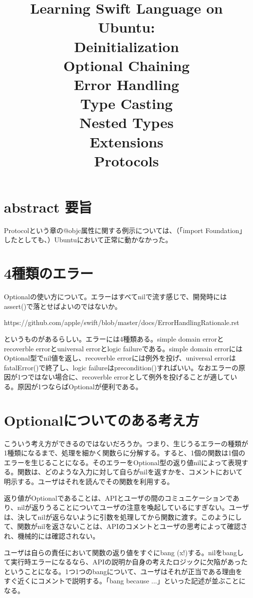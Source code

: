 \documentclass[uplatex,dvipdfmx]{jsarticle} \usepackage{amsmath,amssymb,bm}
\title{Learning Swift Language on Ubuntu:\\Deinitialization\\Optional Chaining\\Error Handling\\Type Casting\\Nested Types\\Extensions\\Protocols} \author{} \date{}
\begin{document}
\maketitle
\section*{abstract 要旨}
Protocolという章の@objc属性に関する例示については、（「import Foundation」したとしても、）Ubuntuにおいて正常に動かなかった。

\section*{4種類のエラー}
Optionalの使い方について。エラーはすべてnilで流す感じで、開発時にはassert()で落とせばよいのではないか。

https://github.com/apple/swift/blob/master/docs/ErrorHandlingRationale.rst

というものがあるらしい。エラーには4種類ある。simple domain errorとrecoverble errorとuniversal errorとlogic failureである。simple domain errorにはOptional型でnil値を返し、recoverble errorには例外を投げ、universal errorはfatalError()で終了し、logic failureはprecondition()すればいい。なおエラーの原因が1つではない場合に、recoverble errorとして例外を投げることが適している。原因が1つならばOptionalが便利である。

\section*{Optionalについてのある考え方}
こういう考え方ができるのではないだろうか。つまり、生じうるエラーの種類が1種類になるまで、処理を細かく関数らに分解する。すると、1個の関数は1個のエラーを生じることになる。そのエラーをOptional型の返り値nilによって表現する。関数は、どのような入力に対して自らがnilを返すかを、コメントにおいて明示する。ユーザはそれを読んでその関数を利用する。

返り値がOptionalであることは、APIとユーザの間のコミュニケーションであり、nilが返りうることについてユーザの注意を喚起しているにすぎない。ユーザは、決してnilが返らないように引数を処理してから関数に渡す。このようにして、関数がnilを返さないことは、APIのコメントとユーザの思考によって確認され、機械的には確認されない。

ユーザは自らの責任において関数の返り値をすぐにbang (x!)する。nilをbangして実行時エラーになるなら、APIの説明か自身の考えたロジックに欠陥があったということになる。1つ1つのbangについて、ユーザはそれが正当である理由をすぐ近くにコメントで説明する。「bang because ...」といった記述が並ぶことになる。
\end{document}
